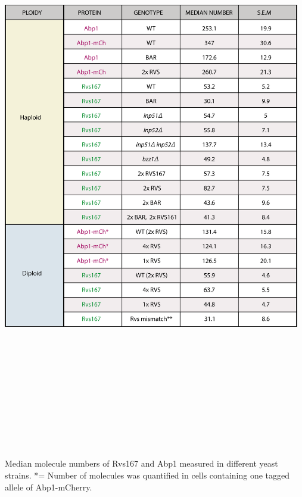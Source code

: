 \newpage
\begin{table}[H]
	\centering
	\includegraphics[width=13cm,height=25cm,keepaspectratio]{figures/results_final/table_numbers}
		\caption[Molecule number of Rvs167 and Abp1]
	{ Median molecule numbers of Rvs167 and Abp1 measured in different yeast strains. *= Number of molecules was quantified in cells containing one tagged allele of Abp1-mCherry. 
	\label{table1_numbers}}
\end{table}

